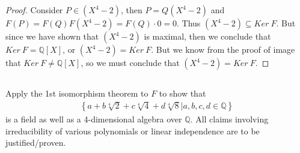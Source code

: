 \documentclass[10pt]{armath}
\newcommand{\Q}{\mathbb{Q}}
\newenvironment{claim}[1]{\par\noindent\textit{Claim:}\space#1}{}
\begin{document}
\begin{proof}
  Consider $P\in(X^4-2)$, then $P=Q(X^4-2)$ and
  $F(P)=F(Q)F(X^4-2)=F(Q)\cdot0=0$. Thus $(X^4-2)\subseteq Ker\ F$. But since
  we have shown that $(X^4-2)$ is maximal, then we conclude that $Ker\
  F=\Q[X]$, or $(X^4-2)=Ker\ F$. But we know from the proof of image that $Ker\
  F\neq\Q[X]$, so we must conclude that $(X^4-2)=Ker\ F$.
\end{proof}

\subsection{}%
\label{sub:2b}

Apply the 1st isomorphism theorem to $F$ to show that
\begin{align*}
  \left\{a+b\sqrt[4]{2}+c\sqrt[4]{4}+d\sqrt[4]{8}\vert a,b,c,d\in\Q\right\}
\end{align*}
is a field as well as a 4-dimensional algebra over $\Q$. All claims involving
irreducibility of various polynomials or linear independence are to be
justified/proven.
\end{document}
